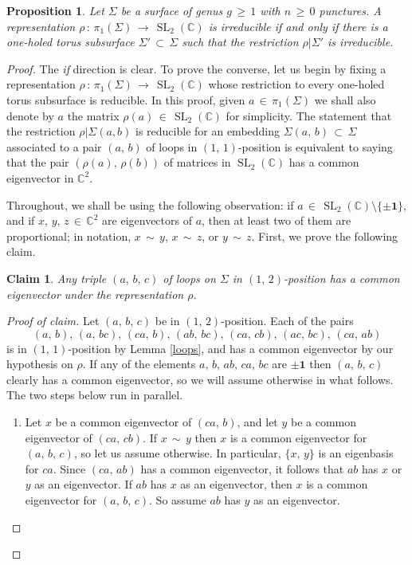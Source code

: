 \documentclass[reqno]{amsart}
\theoremstyle{plain}
\newtheorem{proposition}[theorem]{Proposition}
\newtheorem*{nclaim}{Claim}
\theoremstyle{definition}
\theoremstyle{remark}
\newcommand{\C}{{\mathbb{C}}}
\DeclareMathOperator{\SL}{SL}
\begin{document}
\begin{proposition}
\label{red}
Let $\Sigma$ be a surface of genus $g\,\geq\,1$ with $n\,\geq\,0$ punctures. A representation
$\rho\,:\,\pi_1(\Sigma)\,\to\,\SL_2(\C)$ is irreducible if and only if there is a one-holed torus subsurface
$\Sigma'\,\subset\,\Sigma$ such that the restriction $\rho|\Sigma'$ is irreducible.
\end{proposition}

\begin{proof}
The \emph{if} direction is clear. To prove the converse, let us begin by fixing a representation $\rho\,:\,
\pi_1(\Sigma)\,\to\,\SL_2(\C)$ whose restriction to every one-holed torus subsurface is reducible. In this proof, given
$a\,\in\,\pi_1(\Sigma)$ we shall also denote by $a$ the matrix $\rho(a)\,\in\,\SL_2(\C)$ for simplicity. The
statement that
the restriction $\rho|\Sigma(a,b)$ is reducible for an embedding $\Sigma(a,\,b)\,\subset\, \Sigma$
associated to a pair $(a,\,b)$ of loops in $(1,\,1)$-position is equivalent to saying that the pair $(\rho(a),\,
\rho(b))$ of matrices in $\SL_2(\C)$ has a common eigenvector in $\C^2$.

Throughout, we shall be using the following observation: if $a\,\in\,\SL_2(\C)\setminus\{\pm\mathbf 1\}$, and if 
$x,\,y,\,z\,\in\,\C^2$ are eigenvectors of $a$, then at least two of them are proportional; in notation, $x\,\sim\, y$, 
$x\,\sim\, z$, or $y\,\sim\, z$. First, we prove the following claim.

\begin{nclaim}
Any triple $(a,\,b,\,c)$ of loops on $\Sigma$ in $(1,\,2)$-position has a common eigenvector under the
representation $\rho$.
\end{nclaim}

\begin{proof}[Proof of claim]
Let $(a,\,b,\,c)$ be in $(1,\,2)$-position. Each of the pairs
$$(a,\,b),\,(a,\,bc),\,(ca,\,b),\,(ab,\,bc),\,(ca,\,cb),\,(ac,\,bc),\,(ca,\,ab)$$
is in $(1,\,1)$-position by Lemma \ref{loops}, and has a common eigenvector by our hypothesis on $\rho$. If any
of the elements $a,\,b,\,ab,\,ca,\,bc$ are $\pm\mathbf 1$ then $(a,\,b,\,c)$ clearly has a common eigenvector, so we will assume otherwise in what follows. The two steps below run in parallel.

\begin{enumerate}
\item Let $x$ be a common eigenvector of $(ca,\,b)$, and let $y$ be a common eigenvector of $(ca,\,cb)$. If $x\,\sim 
\,y$ then $x$ is a common eigenvector for $(a,\,b,\,c)$, so let us assume otherwise. In particular, $\{x,\,y\}$ is an 
eigenbasis for $ca$. Since $(ca,\,ab)$ has a common eigenvector, it follows that $ab$ has $x$ or $y$ as an 
eigenvector. If $ab$ has $x$ as an eigenvector, then $x$ is a common eigenvector for $(a,\,b,\,c)$. So assume $ab$ 
has $y$ as an eigenvector.


\end{enumerate}
\end{proof}
\end{proof}
\end{document}
